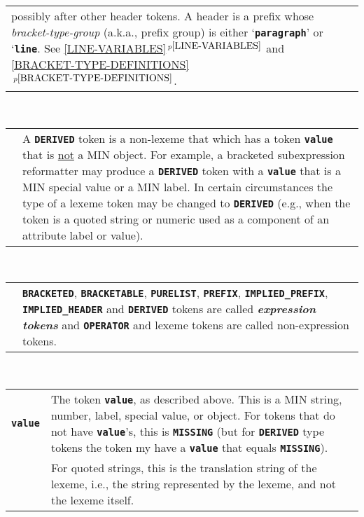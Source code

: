 \documentclass[12pt]{article}
\makeatletter
\newcommand{\TT}[1]{{\tt \bfseries #1}}
\newcommand{\skey}[2]{{\bf \em #1#2}\index{#1}}
\newcommand{\ttmkey}[2]{\TT{#1}\index{#1@\TT{#1}!#2}}
\newcommand{\itemref}[1]{\ref{#1}$\,^{p\pageref{#1}}$}
\newcommand{\EOL}{\penalty \exhyphenpenalty}
\newenvironment{indpar}[1][0.3in]%
	{\begin{list}{}%
		     {\setlength{\itemsep}{0in}%
		      \setlength{\topsep}{0in}%
		      \setlength{\parsep}{1ex}%
		      \setlength{\labelwidth}{#1}%
		      \setlength{\leftmargin}{#1}%
		      \addtolength{\leftmargin}{\labelsep}}%
	 \item}%
	{\end{list}}
\makeatother
\begin{document}
\begin{indpar}
\begin{tabular}{p{1in}p{4.5in}}
		  possibly after other header tokens.  A header
		  is a prefix whose {\em bracket-\EOL type-\EOL group}
		  (a.k.a., prefix group) is
		  either `\TT{paragraph}' or `\TT{line}.
                  See \itemref{LINE-VARIABLES} and
		  \itemref{BRACKET-TYPE-DEFINITIONS}.
\end{tabular}
\\[1ex]
\begin{tabular}{p{1in}p{4.5in}}
		& A \TT{DERIVED} token is a non-lexeme that which has
		  a token \TT{value} that is \underline{not} a MIN object.
		  For example, a bracketed
		  subexpression reformatter may
		  produce a \TT{DERIVED} token with a \TT{value} that is
		  a MIN special value or a MIN label.  In certain circumstances
		  the type of a lexeme token may be changed to
		  \TT{DERIVED} (e.g., when the token is a quoted string
		  or numeric used as a
		  component of an attribute label or value).
\end{tabular}
\\[1ex]  
\begin{tabular}{p{1in}p{4.5in}}
		& \TT{BRACKETED}, \TT{BRACKETABLE}, \TT{PURELIST}, \TT{PREFIX},
		  \TT{IMPLIED\_\EOL PREFIX}, \TT{IMPLIED\_\EOL HEADER}
		  and \TT{DERIVED}
		  tokens are called
		  \skey{expression token}s and \TT{OPERATOR} and lexeme
		  tokens are called non-expression tokens.
\end{tabular}
\\[1ex]
\begin{tabular}{p{1in}p{4.5in}}
\ttmkey{value}{of token}
		& The token \TT{value}, as described above.  This is
		  a MIN string, number, label, special value, or object.
		  For tokens that do not have \TT{value}'s, this is \TT{MISSING}
		  (but for \TT{DERIVED} type tokens the token my have
		  a \TT{value} that equals \TT{MISSING}).
\\[1ex]
		& For quoted strings,
                  this is the translation string of the lexeme,
		  i.e., the string represented by the lexeme,
		  and not the lexeme itself.


\end{tabular}
\end{indpar}
\end{document}
